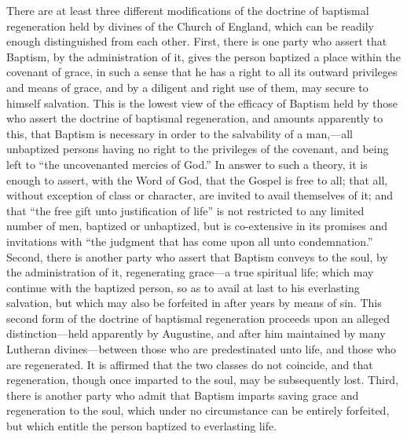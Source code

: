 \documentclass[]{book}
\begin{document}
There are at least three different modifications of the doctrine of baptismal regeneration held by divines of the Church of England, which can be readily enough distinguished from each other. First, there is one party who assert that Baptism, by the administration of it, gives the person baptized a place within the covenant of grace, in such a sense that he has a right to all its outward privileges and means of grace, and by a diligent and right use of them, may secure to himself salvation. This is the lowest view of the efficacy of Baptism held by those who assert the doctrine of baptismal regeneration, and amounts apparently to this, that Baptism is necessary in order to the salvability of a man,---all unbaptized persons having no right to the privileges of the covenant, and being left to ``the uncovenanted mercies of God.'' In answer to such a theory, it is enough to assert, with the Word of God, that the Gospel is free to all; that all, without exception of class or character, are invited to avail themselves of it; and that ``the free gift unto justification of life'' is not restricted to any limited number of men, baptized or unbaptized, but is co-extensive in its promises and invitations with ``the judgment that has come upon all unto condemnation.'' Second, there is another party who assert that Baptism conveys to the soul, by the administration of it, regenerating grace---a true spiritual life; which may continue with the baptized person, so as to avail at last to his everlasting salvation, but which may also be forfeited in after years by means of sin. This second form of the doctrine of baptismal regeneration proceeds upon an alleged distinction---held apparently by Augustine, and after him maintained by many Lutheran divines---between those who are predestinated unto life, and those who are regenerated. It is affirmed that the two classes do not coincide, and that regeneration, though once imparted to the soul, may be subsequently lost. Third, there is another party who admit that Baptism imparts saving grace and regeneration to the soul, which under no circumstance can be entirely forfeited, but which entitle the person baptized to everlasting life.
\end{document}
